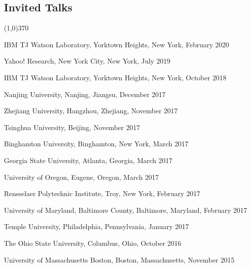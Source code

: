 \documentclass[10pt]{article}
\newenvironment{myindentpar}[1]%
{\begin{list}{}%
         {\setlength{\leftmargin}{#1}}%
         \item[]%
}
{\end{list}}
\newcounter{list}
\begin{document}
\subsection{\sc Invited Talks}
\vspace{-0.4cm} \line(1,0){370} \vspace{-0.1cm}

\begin{myindentpar}{0.75cm}

\hspace{-0.75cm} IBM TJ Watson Laboratory, Yorktown Heights, New York, February 2020
	
\hspace{-0.75cm} Yahoo! Research, New York City, New York, July 2019

\hspace{-0.75cm} IBM TJ Watson Laboratory, Yorktown Heights, New York, October 2018
	
\hspace{-0.75cm} Nanjing University, Nanjing, Jiangsu, December 2017


\hspace{-0.75cm} Zhejiang University, Hangzhou, Zhejiang, November 2017

\hspace{-0.75cm} Tsinghua University, Beijing, November 2017

\hspace{-0.75cm} Binghamton University, Binghamton, New York, March 2017

\hspace{-0.75cm} Georgia State University, Atlanta, Georgia, March 2017

\hspace{-0.75cm} University of Oregon, Eugene, Oregon, March 2017

\hspace{-0.75cm} Rensselaer Polytechnic Institute, Troy, New York, February 2017

\hspace{-0.75cm} University of Maryland, Baltimore County, Baltimore, Maryland, February 2017

\hspace{-0.75cm} Temple University, Philadelphia, Pennsylvania, January 2017

\hspace{-0.75cm} The Ohio State University, Columbus, Ohio, October 2016

\hspace{-0.75cm} University of Massachusetts Boston, Boston, Massachusetts, November 2015

\end{myindentpar}
\end{document}
